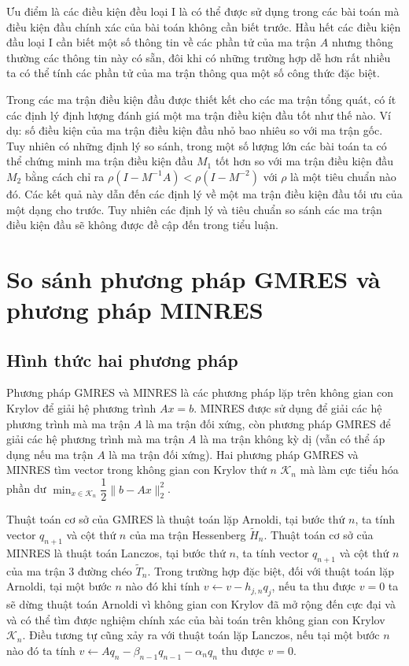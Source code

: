 \documentclass[14pt, a4paper]{article}
\numberwithin{equation}{section}
\numberwithin{algorithm}{section}
\numberwithin{figure}{section}
\numberwithin{dl}{section}
\numberwithin{md}{section}
\numberwithin{bd}{section}
\numberwithin{dn}{section}
\numberwithin{hq}{section}
\begin{document}
Ưu điểm là các điều kiện đều loại I là có thể được sử dụng trong các bài toán mà điều kiện đầu chính xác của bài toán không cần biết trước. Hầu hết các điều kiện đầu loại I cần biết một số thông tin về các phần tử của ma trận $A$ nhưng thông thường các thông tin này có sẵn, đôi khi có những trường hợp dễ hơn rất nhiều ta có thể tính các phần tử của ma trận thông qua một số công thức đặc biệt.

Trong các ma trận điều kiện đầu được thiết kết cho các ma trận tổng quát, có ít các định lý định lượng đánh giá một ma trận điều kiện đầu tốt như thế nào. Ví dụ: số điều kiện của ma trận điều kiện đầu nhỏ bao nhiêu so với ma trận gốc. Tuy nhiên có những định lý so sánh, trong một số lượng lớn các bài toán ta có thể chứng minh ma trận điều kiện đầu $M_1$ tốt hơn so với ma trận điều kiện đầu $M_2$ bằng cách chỉ ra $\rho(I - M^{-1}A) < \rho (I - M^{-2})$ với $\rho$ là một tiêu chuẩn nào đó.
Các kết quả này dẫn đến các định lý về một ma trận điều kiện đầu tối ưu của một dạng cho trước. Tuy nhiên các định lý và tiêu chuẩn so sánh các ma trận điều kiện đầu sẽ không được đề cập đến trong tiểu luận.

\section{So sánh phương pháp GMRES và phương pháp MINRES}

\subsection{Hình thức hai phương pháp}

Phương pháp GMRES và MINRES là các phương pháp lặp trên không gian con Krylov để giải hệ phương trình $Ax=b$.
MINRES được sử dụng để giải các hệ phương trình mà ma trận $A$ là ma trận đối xứng, còn phương pháp GMRES để giải các hệ phương trình mà ma trận $A$ là ma trận không kỳ dị (vẫn có thể áp dụng nếu ma trận $A$ là ma trận đối xứng).
Hai phương pháp GMRES và MINRES tìm vector trong không gian con Krylov thứ $n$ $\displaystyle \mathcal{K}_n$ mà làm cực tiểu hóa phần dư $\displaystyle \min_{x \in \mathcal{K}_n}\dfrac{1}{2}\lVert b - Ax \rVert_2^2$.

Thuật toán cơ sở của GMRES là thuật toán lặp Arnoldi, tại bước thứ $n$, ta tính vector $q_{n+1}$ và cột thứ $n$ của ma trận Hessenberg $\widetilde{H}_n$. Thuật toán cơ sở của MINRES là thuật toán Lanczos, tại bước thứ $n$, ta tính vector $q_{n+1}$ và cột thứ $n$ của ma trận 3 đường chéo $\widetilde{T}_n$.
Trong trường hợp đặc biệt, đối với thuật toán lặp Arnoldi, tại một bước $n$ nào đó khi tính $v \leftarrow v - h_{j,n}q_j$, nếu ta thu được $v=0$ ta sẽ dừng thuật toán Arnoldi vì không gian con Krylov đã mở rộng đến cực đại và và có thể tìm được nghiệm chính xác của bài toán trên không gian con Krylov $\mathcal{K}_n$. 
Điều tương tự cũng xảy ra với thuật toán lặp Lanczos, nếu tại một bước $n$ nào đó ta tính $v \leftarrow Aq_n - \beta_{n-1}q_{n-1} - \alpha_n q_n$ thu được $v = 0$.
\end{document}
